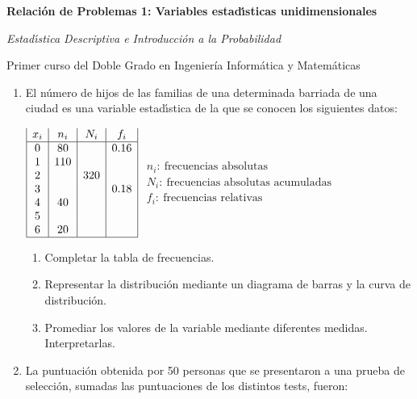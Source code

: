\documentclass[11pt]{book}
\begin{document}
\centerline{\large \bf Relaci{\'o}n de Problemas 1: Variables estad{\'\i}sticas unidimensionales} \smallskip
\centerline{\large \it Estad{\'\i}stica Descriptiva e Introducci{\'o}n a la Probabilidad}

\centerline{Primer curso del Doble Grado en Ingenier\'ia Inform\'atica y Matem{\'a}ticas}
\hrulefill \vskip 0.5cm
\begin{enumerate}
\item El n{\'u}mero de hijos de las familias de una determinada
barriada de una ciudad es una variable estad{\'\i}stica de la que se
conocen los siguientes datos:

\hskip 3cm $\begin{array}{|c|c|c|c|}
  x_{i} & n_{i} & N_{i} & f_{i}
\\   \hline
  0 & 80  &     & 0\mbox{.}16 \\
  1 & 110 &     &      \\
  2 &     & 320 &      \\
  3 &     &     & 0\mbox{.}18 \\
  4 & 40  &     &      \\
  5 &     &     &      \\
  6 & 20  &     &  \\ \hline
\end{array}$   \hskip 1.5cm $\begin{array}{l}  n_i: \ \mbox{frecuencias absolutas} \\ N_i:  \ \mbox{frecuencias absolutas acumuladas}\\ f_i:  \ \mbox{frecuencias relativas}\end{array}$
\begin{enumerate}
    \item Completar la tabla de frecuencias.
    \item Representar la distribuci{\'o}n mediante un diagrama de
    barras y la curva de distribuci{\'o}n.
    \item Promediar los valores de la variable mediante diferentes
    medidas. Interpretarlas.
\end{enumerate}
\vskip 0.3cm \item La puntuaci{\'o}n obtenida por 50 personas que se presentaron a  una  prueba
   de selecci{\'o}n, sumadas las puntuaciones de los distintos tests, fueron:


\end{enumerate}
\end{document}

